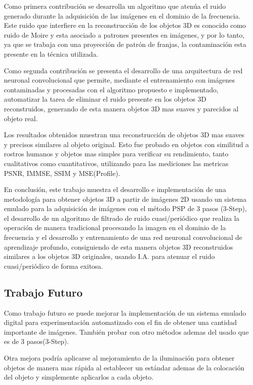 \documentclass[10pt,letterpaper]{article}
\begin{document}
Como primera contribución se desarrolla un algoritmo que atenúa el ruido generado durante la adquisición de las imágenes en el dominio de la frecuencia. Este ruido que interfiere en la reconstrucción de los objetos 3D es conocido como ruido de Moire y esta asociado a patrones presentes en imágenes, y por lo tanto, ya que se trabaja con una proyección de patrón de franjas, la contaminación esta presente en la técnica utilizada.

Como segunda contribución se presenta el desarrollo de una arquitectura de red neuronal convolucional que permite, mediante el entrenamiento con imágenes contaminadas y procesadas con el algoritmo propuesto e implementado, automatizar la tarea de eliminar el ruido presente en los objetos 3D reconstruidos, generando de esta manera objetos 3D mas suaves y parecidos al objeto real.

Los resultados obtenidos muestran una reconstrucción de objetos 3D mas suaves y precisos similares al objeto original. Esto fue probado en objetos con similitud a rostros humanos y objetos mas simples para verificar su rendimiento, tanto cualitativos como cuantitativos, utilizando para las mediciones las metricas PSNR, IMMSE, SSIM y MSE(Profile).

En conclusión, este trabajo muestra el desarrollo e implementación de una metodología para obtener objetos 3D a partir de imágenes 2D usando un sistema emulado para la adquisición de imágenes con el método PSP de 3 pasos (3-Step), el desarrollo de un algoritmo de filtrado de ruido cuasi/periódico que realiza la operación de manera tradicional procesando la imagen en el dominio de la frecuencia y el desarrollo y entrenamiento de una red neuronal convolucional de aprendizaje profundo, consiguiendo de esta manera objetos 3D reconstruidos similares a los objetos 3D originales, usando I.A. para atenuar el ruido cuasi/periódico de forma exitosa.

\subsection{Trabajo Futuro}
Como trabajo futuro se puede mejorar la implementación de un sistema emulado digital para experimentación automatizado con el fin de obtener una cantidad importante de imágenes. También probar con otro métodos ademas del usado que es de 3 pasos(3-Step). 

Otra mejora podría aplicarse al mejoramiento de la iluminación para obtener objetos de manera mas rápida al establecer un estándar ademas de la colocación del objeto y simplemente aplicarlos a cada objeto. 
\end{document}
